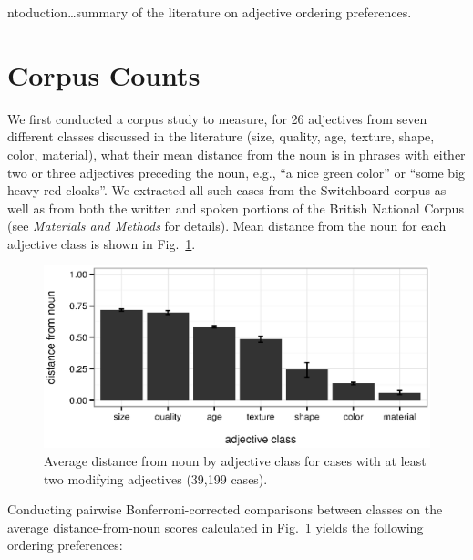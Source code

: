 \documentclass{pnastwo}
\newcommand{\figref}[1]{Fig.~\ref{#1}}
\begin{document}
\begin{article}
\begin{abstract}
{Abstract here\ldots}
\end{abstract}



ntoduction\ldots summary of the literature on adjective ordering preferences.


\section{Corpus Counts}

We first conducted a corpus study to measure, for 26 adjectives from seven different classes discussed in the literature (size, quality, age, texture, shape, color, material), what their mean distance from the noun is in phrases with either two or three adjectives preceding the noun, e.g., ``a nice green color'' or ``some big heavy red cloaks''. We extracted all such cases from the Switchboard corpus as well as from both the written and spoken portions of the British National Corpus (see \emph{Materials and Methods} for details). Mean distance from the noun for each adjective class is shown in \figref{fig:distance}.

\begin{figure}[h]
	\centering
	\includegraphics[width=.95\linewidth]{plots/corpus_distance_plot.eps}
	\caption{Average distance from noun by adjective class for cases with at least two modifying adjectives (39,199 cases).}\label{distance-from-noun}
	\label{fig:distance}
\end{figure}

Conducting pairwise Bonferroni-corrected comparisons between classes on the average distance-from-noun scores calculated in \figref{fig:distance} yields the following ordering preferences:


\end{article}
\end{document}

